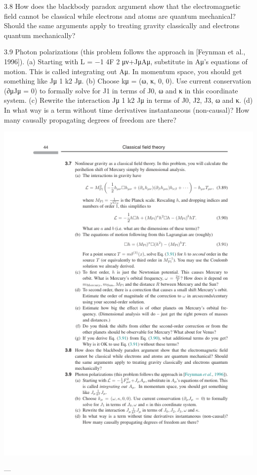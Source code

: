 3.8 How does the blackbody paradox argument show that the electromagnetic ﬁeld
cannot be classical while electrons and atoms are quantum mechanical? Should
the same arguments apply to treating gravity classically and electrons quantum
mechanically?

3.9 Photon polarizations (this problem follows the approach in [Feynman et al., 1996]).
(a) Starting with L = −1
4F 2
μν+JμAμ, substitute in Aμ’s equations of motion. This
is called integrating out Aμ. In momentum space, you should get something
like Jμ 1
k2 Jμ.
(b) Choose kμ = (ω, κ, 0, 0). Use current conservation (∂μJμ = 0) to formally
solve for J1 in terms of J0, ω and κ in this coordinate system.
(c) Rewrite the interaction Jμ 1
k2 Jμ in terms of J0, J2, J3, ω and κ.
(d) In what way is a term without time derivatives instantaneous (non-causal)?
How many causally propagating degrees of freedom are there?

\includegraphics{./figs/3_Classical_field_theory_page_64.png}

---


